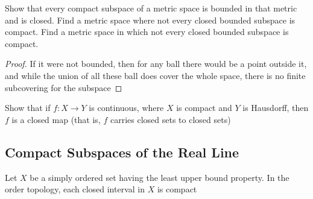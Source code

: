 \documentclass[11pt]{article}
\begin{document}
\begin{exercise}
\label{ex26.4}
Show that every compact subspace of a metric space is bounded in that metric and is closed. Find
a metric space where not every closed bounded subspace is compact. Find a metric space in which
not every closed bounded subspace is compact.
\end{exercise}

\begin{proof}
If it were not bounded, then for any ball there would be a point outside it, and while the union
of all these ball does cover the whole space, there is no finite subcovering for the subspace
\end{proof}

\begin{exercise}
Show that if \(f:X\to Y\) is continuous, where \(X\) is compact and \(Y\) is Hausdorff, then \(f\)
is a closed map (that is, \(f\) carries closed sets to closed sets)
\end{exercise}

\subsection{Compact Subspaces of the Real Line}
\label{sec:orga0c10a8}
\begin{theorem}[]
Let \(X\) be a simply ordered set having the least upper bound property. In the order topology,
each closed interval in \(X\) is compact
\end{theorem}
\end{document}
